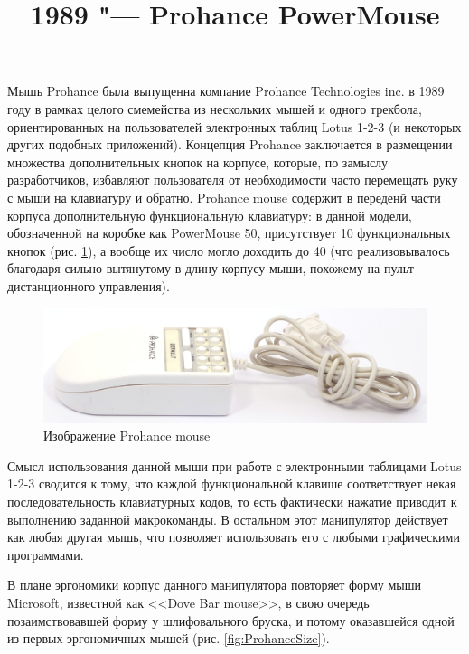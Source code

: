 \documentclass[11pt, a4paper]{article}
\begin{document}
\title{1989 "--- Prohance PowerMouse}
\date{}
\maketitle

Мышь Prohance была выпущенна компание Prohance Technologies inc. в 1989 году в рамках целого смемейства из нескольких мышей и одного трекбола, ориентированных на пользователей электронных таблиц Lotus 1-2-3 (и некоторых других подобных приложений). Концепция Prohance заключается в размещении множества дополнительных кнопок на корпусе, которые, по замыслу разработчиков, избавляют пользователя от необходимости часто перемещать руку с мыши на клавиатуру и обратно. Prohance mouse содержит в переденй части корпуса дополнительную функциональную клавиатуру: в данной модели, обозначенной на коробке как PowerMouse 50, присутствует 10 функциональных кнопок (рис. \ref{fig:ProhancePhoto}), а вообще их число могло доходить до 40 (что реализовывалось благодаря сильно вытянутому в длину корпусу мыши, похожему на пульт дистанционного управления).

\begin{figure}[h]
    \centering
    \includegraphics[scale=0.55]{1989_prohance_powermouse/pic_30.jpg}
    \caption{Изображение Prohance mouse}
    \label{fig:ProhancePhoto}
\end{figure}

Смысл использования данной мыши при работе с электронными таблицами Lotus 1-2-3 сводится к тому, что каждой функциональной клавише соответствует некая последовательность клавиатурных кодов, то есть фактически нажатие приводит к выполнению заданной макрокоманды. В остальном этот манипулятор действует как любая другая мышь, что позволяет использовать его с любыми графическими программами.

В плане эргономики корпус данного манипулятора повторяет форму мыши Microsoft, известной как <<Dove Bar mouse>>, в свою очередь позаимствовавшей форму у шлифовального бруска, и потому оказавшейся одной из первых эргономичных мышей (рис. \ref{fig:ProhanceSize}). 
\end{document}
